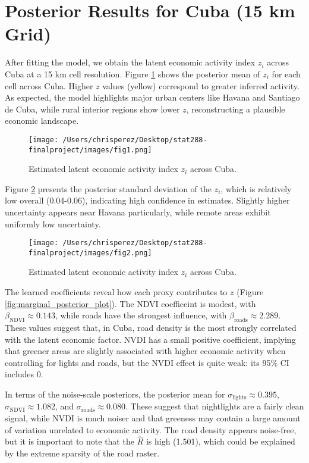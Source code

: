 \documentclass[12pt]{article}
\begin{document}
\section{Posterior Results for Cuba (15 km Grid)}

After fitting the model, we obtain the latent economic activity index $z_i$ across Cuba at a 15 km cell resolution. Figure \ref{fig:posterior_map_round1} shows the posterior mean of $z_i$ for each cell across Cuba. Higher $z$ values (yellow) correspond to greater inferred activity. As expected, the model highlights major urban centers like Havana and Santiago de Cuba, while rural interior regions show lower $z$, reconstructing a plausible economic landscape.

\begin{figure}[H]
  \centering
  \texttt{[image: /Users/chrisperez/Desktop/stat288-finalproject/images/fig1.png]}
  \caption{Estimated latent economic activity index $z_i$ across Cuba.}
  \label{fig:posterior_map_round1} 
\end{figure}


Figure \ref{fig:posterior_map_round1_uncertainty} presents the posterior standard deviation of the $z_i$, which is relatively low overall (0.04-0.06), indicating high confidence in estimates. Slightly higher uncertainty appears near Havana particularly, while remote areas exhibit uniformly low uncertainty.

\begin{figure}[H]
  \centering
  \texttt{[image: /Users/chrisperez/Desktop/stat288-finalproject/images/fig2.png]}
  \caption{Estimated latent economic activity index $z_i$ across Cuba.}
  \label{fig:posterior_map_round1_uncertainty} 
\end{figure}


The learned coefficients reveal how each proxy contributes to $z$ (Figure \ref{fig:marginal_posterior_plot}). The NDVI coefficeint is modest, with $\beta_{\text{NDVI}} \approx 0.143$, while roads have the strongest influence, with $\beta_{\text{roads}} \approx 2.289$. These values suggest that, in Cuba, road density is the most strongly correlated with the latent economic factor. NVDI has a small positive coefficient, implying that greener areas are slightly associated with higher economic activity when controlling for lights and roads, but the NVDI effect is quite weak: its 95\% CI includes 0.

In terms of the noise-scale posteriors, the posterior mean for $\sigma_{\text{lights}} \approx 0.395$, $\sigma_{\text{NDVI}} \approx 1.082$, and $\sigma_{\text{roads}} \approx 0.080$. These suggest that nightlights are a fairly clean signal, while NVDI is much noiser and that greeness may contain a large amount of variation unrelated to economic activity. The road density appears noise-free, but it is important to note that the $\hat R$ is high (1.501), which could be explained by the extreme sparsity of the road raster.
\end{document}
